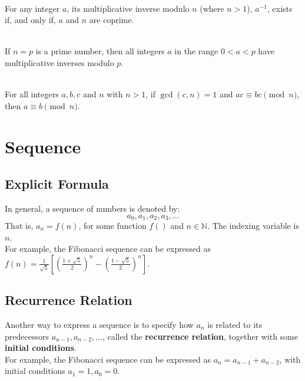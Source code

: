 \documentclass[12pt]{article}
\begin{document}
\begin{theorem}[4.7.3]
\hfill\\
\normalfont For any integer $a$, its multiplicative inverse modulo $n$ (where $n > 1$), $a^{-1}$,
exists if, and only if, $a$ and $n$ are coprime.
\end{theorem}
\begin{corollary}[4.7.4]
\hfill\\
\normalfont If $n = p$ is a prime number, then all integers $a$ in the range $0 < a < p$
have multiplicative inverses modulo $p$.
\end{corollary}
\begin{theorem}[8.4.9(Epp)]
\hfill\\
\normalfont For all integers $a, b, c$ and $n$ with $n>1$, if $\gcd(c, n) = 1$ and $ac \equiv bc \pmod{n}$, then
$a \equiv b \pmod{n}$.
\end{theorem}
\clearpage
\section{Sequence}
\subsection{Explicit Formula}
In general, a sequence of numbers is denoted by:
\[
a_0,a_1,a_2,a_3,\ldots
\]
That is, $a_n = f(n)$, for some function $f()$ and $n\in\mathbb{N}$. The indexing variable is $n$.\\
For example, the Fibonacci sequence can be expressed as $f(n) = \frac{1}{\sqrt{5}}\left[\left(\frac{1+\sqrt{5}}{2}\right)^n -\left(\frac{1-\sqrt{5}}{2}\right)^n\right]$.
\subsection{Recurrence Relation}
Another way to express a sequence is to specify how $a_n$ is related to its predecessors $a_{n-1}, a_{n-2},\ldots$, called the \textbf{recurrence relation}, together with some \textbf{initial conditions}.\\
For example, the Fibonacci sequence can be expressed as $a_n=a_{n-1}+a_{n-2}$, with initial conditions $a_1 =1, a_0 = 0$.
\end{document}
